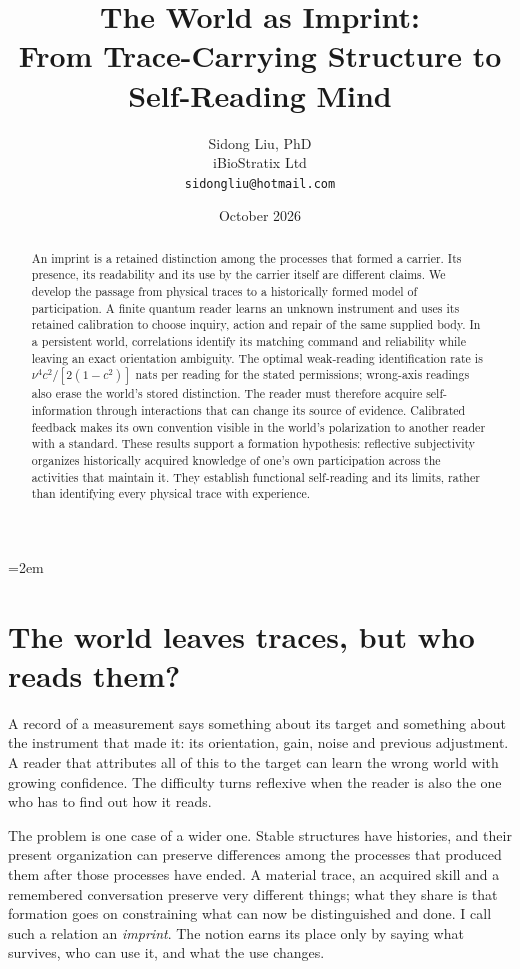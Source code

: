 \documentclass[11pt,a4paper]{article}
\title{The World as Imprint:\\From Trace-Carrying Structure to Self-Reading Mind}
\author{Sidong Liu, PhD\\iBioStratix Ltd\\\texttt{sidongliu@hotmail.com}}
\date{October 2026}
\begin{document}
\emergencystretch=2em
\maketitle

\begin{abstract}
An imprint is a retained distinction among the processes that formed a
carrier. Its presence, its readability and its use by the carrier itself
are different claims. We develop the passage from physical traces to a
historically formed model of participation. A finite quantum reader learns
an unknown instrument and uses its retained calibration to choose inquiry,
action and repair of the same supplied body. In a persistent world,
correlations identify its matching command and reliability while leaving
an exact orientation ambiguity. The optimal weak-reading identification
rate is $\nu^4c^2/[2(1-c^2)]$ nats per reading for the stated permissions;
wrong-axis readings also erase the world's stored distinction.
The reader must therefore acquire self-information through interactions
that can change its source of evidence. Calibrated feedback makes its own
convention visible in the world's polarization to another reader with
a standard. These results support a formation hypothesis: reflective
subjectivity organizes historically acquired knowledge of one's own
participation across the activities that maintain it.
They establish functional self-reading and its limits, rather than
identifying every physical trace with experience.
\end{abstract}

\section{The world leaves traces, but who reads them?}

A record of a measurement says something about its target and something about the instrument that made it: its orientation, gain, noise and previous adjustment. A reader that attributes all of this to the target can learn the wrong world with growing confidence. The difficulty turns reflexive when the reader is also the one who has to find out how it reads.

The problem is one case of a wider one. Stable structures have histories, and their present organization can preserve differences among the processes that produced them after those processes have ended. A material trace, an acquired skill and a remembered conversation preserve very different things; what they share is that formation goes on constraining what can now be distinguished and done. I call such a relation an \emph{imprint}. The notion earns its place only by saying what survives, who can use it, and what the use changes.
\end{document}

